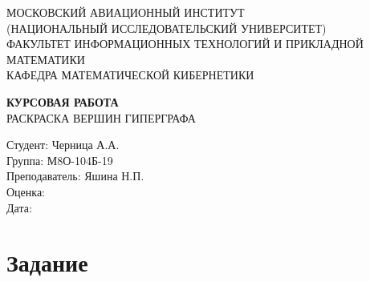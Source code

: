 \documentclass[12pt,a4paper]{article}
\begin{document}
{}
\begin{titlepage}
   \begin{center}

      \textsc{МОСКОВСКИЙ АВИАЦИОННЫЙ ИНСТИТУТ \\
      (НАЦИОНАЛЬНЫЙ ИССЛЕДОВАТЕЛЬСКИЙ УНИВЕРСИТЕТ) \\
      ФАКУЛЬТЕТ ИНФОРМАЦИОННЫХ ТЕХНОЛОГИЙ И ПРИКЛАДНОЙ МАТЕМАТИКИ \\
      КАФЕДРА МАТЕМАТИЧЕСКОЙ КИБЕРНЕТИКИ}

      \vspace*{\fill}
      \textsc{\textbf{\Huge{КУРСОВАЯ РАБОТА}}\\
      \large{РАСКРАСКА ВЕРШИН ГИПЕРГРАФА}
      }
      \vspace*{\fill}

      \vfill
      \begin{flushright}
         \begin{minipage}{2.5in}
            \large{ 
               Студент: Черница А.А. \\
               Группа: М8О-104Б-19 \\ 
               Преподаватель: Яшина Н.П. \\
               Оценка: \\
               Дата: \\
            }
         \end{minipage}
      \end{flushright}
      
   \end{center}
\end{titlepage}


\setcounter{page}{2}
\section*{Задание}
\end{document}
